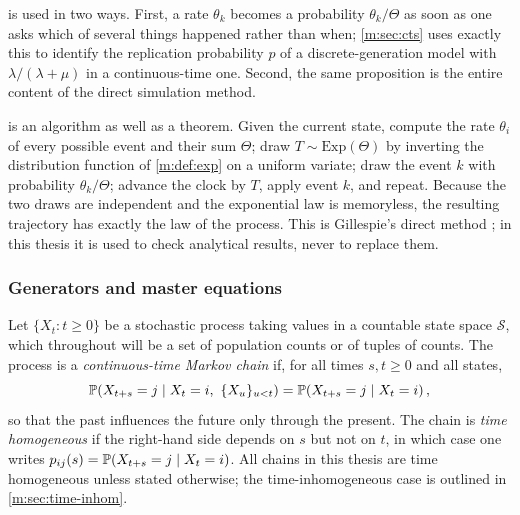  is used in two ways. First, a rate $\theta_k$ becomes a
probability $\theta_k/\Theta$ as soon as one asks which of several things happened
rather than when; \cref{m:sec:cts} uses exactly this to identify the replication
probability $p$ of a discrete-generation model with $\lambda/(\lambda+\mu)$ in a
continuous-time one. Second, the same proposition is the entire content of the
direct simulation method.

\begin{remark}
\label{m:rem:gillespie}
 is an algorithm as well as a theorem. Given the current state,
compute the rate $\theta_i$ of every possible event and their sum $\Theta$; draw
$T\sim\mathrm{Exp}(\Theta)$ by inverting the distribution function of
\cref{m:def:exp} on a uniform variate; draw the event $k$ with probability
$\theta_k/\Theta$; advance the clock by $T$, apply event $k$, and repeat. Because
the two draws are independent and the exponential law is memoryless, the resulting
trajectory has exactly the law of the process. This is Gillespie's direct method
\cite{Gillespie1977}; in this thesis it is used to check analytical results, never to
replace them.
\end{remark}



\subsubsection{Generators and master equations}
\label{m:sec:ctmc}

Let $\{X_t : t\ge0\}$ be a stochastic process taking values in a countable state
space $\mathcal S$, which throughout will be a set of population counts or of
tuples of counts. The process is a \emph{continuous-time Markov chain} if, for all
times $s,t\ge0$ and all states,
\begin{equation}
\label{m:eq:markov}
\mathbb{P}\!\left(X_{t+s} = j \mid X_t = i,\ \{X_u\}_{u<t}\right) = \mathbb{P}\!\left(X_{t+s}=j\mid X_t = i\right),
\end{equation}
so that the past influences the future only through the present. The chain is
\emph{time homogeneous} if the right-hand side depends on $s$ but not on $t$, in
which case one writes $p_{ij}(s) = \mathbb{P}\!\left(X_{t+s}=j\mid X_t=i\right)$. All chains in this thesis are time homogeneous unless stated otherwise; the
time-inhomogeneous case is outlined in \cref{m:sec:time-inhom}.

